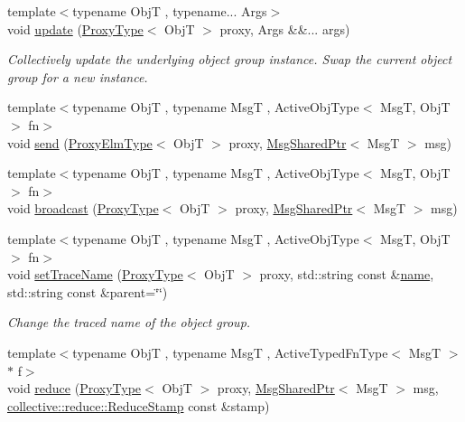 \begin{DoxyCompactItemize}
{\footnotesize template$<$typename ObjT , typename... Args$>$ }\\void \hyperlink{structvt_1_1objgroup_1_1_obj_group_manager_a36d8749cf4f42e6b912159e9b4f959d6}{update} (\hyperlink{structvt_1_1objgroup_1_1_obj_group_manager_aea65eef52f240a52210132eef5ce591f}{Proxy\+Type}$<$ ObjT $>$ proxy, Args \&\&... args)
\begin{DoxyCompactList}\small\item\em Collectively update the underlying object group instance. Swap the current object group for a new instance. \end{DoxyCompactList}\item 
{\footnotesize template$<$typename ObjT , typename MsgT , Active\+Obj\+Type$<$ Msg\+T, Obj\+T $>$ fn$>$ }\\void \hyperlink{structvt_1_1objgroup_1_1_obj_group_manager_a4b45c347778fda185d97b4c6af4ec58e}{send} (\hyperlink{structvt_1_1objgroup_1_1_obj_group_manager_adba6c8ecb0f4c30e719f1abb995cfc9b}{Proxy\+Elm\+Type}$<$ ObjT $>$ proxy, \hyperlink{namespacevt_ab2b3d506ec8e8d1540aede826d84a239}{Msg\+Shared\+Ptr}$<$ MsgT $>$ msg)
\item 
{\footnotesize template$<$typename ObjT , typename MsgT , Active\+Obj\+Type$<$ Msg\+T, Obj\+T $>$ fn$>$ }\\void \hyperlink{structvt_1_1objgroup_1_1_obj_group_manager_a11a5b325363050d55b7428c84bcaa24b}{broadcast} (\hyperlink{structvt_1_1objgroup_1_1_obj_group_manager_aea65eef52f240a52210132eef5ce591f}{Proxy\+Type}$<$ ObjT $>$ proxy, \hyperlink{namespacevt_ab2b3d506ec8e8d1540aede826d84a239}{Msg\+Shared\+Ptr}$<$ MsgT $>$ msg)
\item 
{\footnotesize template$<$typename ObjT , typename MsgT , Active\+Obj\+Type$<$ Msg\+T, Obj\+T $>$ fn$>$ }\\void \hyperlink{structvt_1_1objgroup_1_1_obj_group_manager_a922a82ded79fdefb5fd7de60bde77aad}{set\+Trace\+Name} (\hyperlink{structvt_1_1objgroup_1_1_obj_group_manager_aea65eef52f240a52210132eef5ce591f}{Proxy\+Type}$<$ ObjT $>$ proxy, std\+::string const \&\hyperlink{structvt_1_1objgroup_1_1_obj_group_manager_a92c0b07c2d90063c40087f625880cca3}{name}, std\+::string const \&parent=\char`\"{}\char`\"{})
\begin{DoxyCompactList}\small\item\em Change the traced name of the object group. \end{DoxyCompactList}\item 
{\footnotesize template$<$typename ObjT , typename MsgT , Active\+Typed\+Fn\+Type$<$ Msg\+T $>$ $\ast$ f$>$ }\\void \hyperlink{structvt_1_1objgroup_1_1_obj_group_manager_ae794f79a67e0a916b175ab9853185339}{reduce} (\hyperlink{structvt_1_1objgroup_1_1_obj_group_manager_aea65eef52f240a52210132eef5ce591f}{Proxy\+Type}$<$ ObjT $>$ proxy, \hyperlink{namespacevt_ab2b3d506ec8e8d1540aede826d84a239}{Msg\+Shared\+Ptr}$<$ MsgT $>$ msg, \hyperlink{namespacevt_1_1collective_1_1reduce_a7b7cb3021ac5654d92825d9fab0250b2}{collective\+::reduce\+::\+Reduce\+Stamp} const \&stamp)

\end{DoxyCompactItemize}

